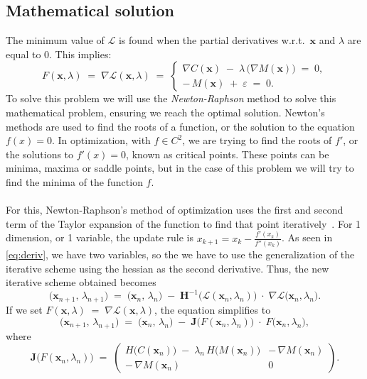 \documentclass[12pt]{extarticle}
\numberwithin{equation}{section}
\begin{document}
\subsection{Mathematical solution}
The minimum value of $\mathcal{L}$ is found when the partial derivatives 
w.r.t.\ $\mathbf{x}$ and $\lambda$ are equal to 0. This implies:
\begin{equation}\label{eq:deriv}
F(\mathbf{x}, \lambda) \;=\; \nabla \mathcal{L}(\mathbf{x}, \lambda) \;=\;
\begin{cases}
\nabla C(\mathbf{x}) \;-\;\lambda\,\bigl(\nabla M(\mathbf{x})\bigr) \;=\; 0, \\
-\,M(\mathbf{x})\;+\;\varepsilon\;=\;0.
\end{cases}
\end{equation}
\noindent
To solve this problem we will use the \emph{Newton-Raphson} method to solve this mathematical problem, ensuring we reach the optimal solution. Newton's methods are used to find the roots of a function, or the solution to the equation $f(x) = 0$. In optimization, with $f \in C^2$, we are trying to find the roots of $f'$, or the solutions to $f'(x) = 0$, known as critical points. These points can be minima, maxima or saddle points, but in the case of this problem we will try to find the minima of the function $f$. \\
\\
For this, Newton-Raphson’s method of optimization uses the first and second term of the Taylor expansion of the function to find that point iteratively~\cite{fliege2009newton}. For 1 dimension, or 1 variable, the update rule is $x_{k+1}=x_{k}-{\frac {f'(x_{k})}{f''(x_{k})}}$. As seen in \eqref{eq:deriv}, we have two variables, so the we have to use the generalization of the iterative scheme using the hessian as the second derivative. Thus, the new iterative scheme obtained becomes
\[
\bigl(\mathbf{x}_{n+1},\,\lambda_{n+1}\bigr)
\;=\;
\bigl(\mathbf{x}_n,\,\lambda_n\bigr)
\;-\;
\mathbf{H}^{-1}\!\bigl(\mathcal{L}(\mathbf{x}_n,\lambda_n)\bigr)
\;\cdot\;
\nabla\mathcal{L}\bigl(\mathbf{x}_n,\lambda_n\bigr).
\]
\noindent
If we set $F(\mathbf{x},\lambda) \;=\;\nabla \mathcal{L}(\mathbf{x},\lambda)$, 
the equation simplifies to
\[
\bigl(\mathbf{x}_{n+1},\,\lambda_{n+1}\bigr)
\;=\;
\bigl(\mathbf{x}_n,\,\lambda_n\bigr)
\;-\;
\mathbf{J}\!\bigl(F(\mathbf{x}_n,\lambda_n)\bigr)
\;\cdot\;
F\!\bigl(\mathbf{x}_n,\lambda_n\bigr),
\]
where
\[
\mathbf{J}\!\bigl(F(\mathbf{x}_n,\lambda_n)\bigr)
\;=\;
\begin{pmatrix}
H\!\bigl(C(\mathbf{x}_n)\bigr)\;-\;\lambda_n\,H\!\bigl(M(\mathbf{x}_n)\bigr) 
    & -\,\nabla M(\mathbf{x}_n)
\\[6pt]
-\,\nabla M(\mathbf{x}_n)
    & 0
\end{pmatrix}.
\]
\end{document}
